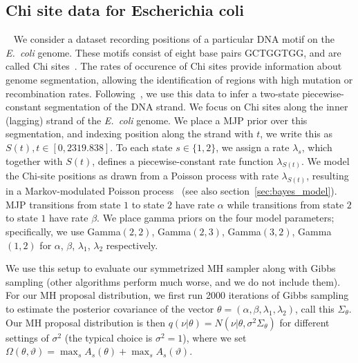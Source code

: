  \subsection{Chi site data for Escherichia coli}~
  We consider a dataset recording positions of a particular DNA motif 
  on the {\em E.\ coli} genome. 
  These motifs consist of eight base pairs GCTGGTGG, and are called Chi sites~\citep{FearnSher2006}.
  The rates of occurence of Chi sites provide information about genome 
  segmentation, allowing the identification of regions with high 
  mutation or recombination rates.
  Following~\cite{FearnSher2006}, we use this data to infer a two-state piecewise-constant segmentation of the DNA strand. 
  We focus on Chi sites along the inner (lagging) strand of the {\em E.\ coli} genome.  
  We place a MJP prior over this segmentation, and indexing position along the 
  strand with $t$, we write this as $S(t), t \in [0,2319.838]$. 
  To each state $s \in \{1,2\}$, we assign a rate $\lambda_s$, which together with $S(t)$, defines a piecewise-constant rate function $\lambda_{S(t)}$. 
  We model the Chi-site positions as drawn from a Poisson process with rate 
  $\lambda_{S(t)}$, resulting in a {Markov-modulated Poisson process}~\citep{scottmmpp03} (see also section~\ref{sec:bayes_model}). 
  MJP transitions from state $1$ to state $2$ have rate $\alpha$ while transitions from state $2$ to state $1$ have rate $\beta$. 
  We place gamma priors on the four model parameters; specifically, we use Gamma$(2,2)$, Gamma$(2,3)$, Gamma$(3,2)$, Gamma$(1,2)$ for $\alpha$, $\beta$, $\lambda_1$, $\lambda_2$ respectively.


  We use this setup to evaluate our symmetrized MH sampler along with Gibbs sampling (other algorithms perform much worse, and we do not include them). 
  For our MH proposal distribution, we first run {2000} iterations of Gibbs sampling to estimate the posterior covariance of the vector $\theta = (\alpha,\beta,\lambda_1,\lambda_2)$, call this $\Sigma_\theta$. 
  Our MH proposal distribution is then $q(\nu|\theta) = N(\nu|\theta, \sigma^2\Sigma_\theta)$ for different settings of $\sigma^2$ (the typical choice is $\sigma^2 = 1$),
where we set $\Omega(\theta, \vartheta) = \max_s A_s(\theta) + \max_s A_s(\vartheta)$. 

